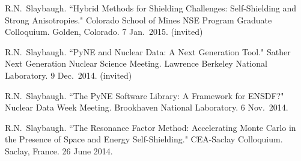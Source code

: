 \begin{bibsection}
\item R.N.\ Slaybaugh. ``Hybrid Methods for Shielding Challenges: Self-Shielding and Strong Anisotropies." Colorado School of Mines NSE Program Graduate Colloquium. Golden, Colorado. 7 Jan.\ 2015. (invited)


\item R.N.\ Slaybaugh. ``PyNE and Nuclear Data: A Next Generation Tool." Sather Next Generation Nuclear Science Meeting. Lawrence Berkeley National Laboratory. 9 Dec.\ 2014. (invited)




\item R.N.\ Slaybaugh. ``The PyNE Software Library: A Framework for ENSDF?" Nuclear Data Week Meeting. Brookhaven National Laboratory. 6 Nov.\ 2014. 



\item R.N.\ Slaybaugh. ``The Resonance Factor Method: Accelerating Monte Carlo in the Presence of Space and Energy Self-Shielding." CEA-Saclay Colloquium. Saclay, France. 26 June 2014.


\end{bibsection}
